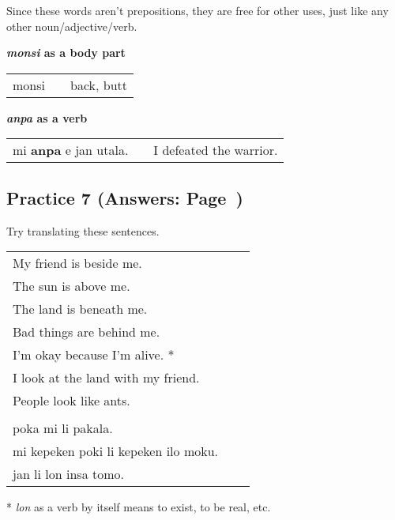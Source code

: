 Since these words aren't prepositions, they are free for other uses, just like any other noun/adjective/verb.

\textbf{\textit{monsi} as a body part} \\
\begin{supertabular}{p{5,5cm}|ll}
monsi && back, butt \\
\end{supertabular} 

\textbf{\textit{anpa} as a verb} \\
\begin{supertabular}{p{5,5cm}|ll}
mi \textbf{anpa} e jan utala. && I defeated the warrior. \\
\end{supertabular} 
%







\subsection*{Practice 7 (Answers: Page~\pageref{'other_prepositions'})}
%
Try translating these sentences.

\begin{supertabular}{p{5,5cm}|ll}
My friend is beside me. && \\ %
The sun is above me. && \\ %
The land is beneath me. && \\ %
Bad things are behind me. && \\ %
I'm okay because I'm alive. * && \\ %
I look at the land with my friend. && \\ %
People look like ants. && \\ %
 && \\ %
poka mi li pakala. && \\ %
mi kepeken poki li kepeken ilo moku. && \\ %
jan li lon insa tomo. && \\ %
\end{supertabular} 

* \textit{lon} as a verb by itself means to exist, to be real, etc. 
% 
